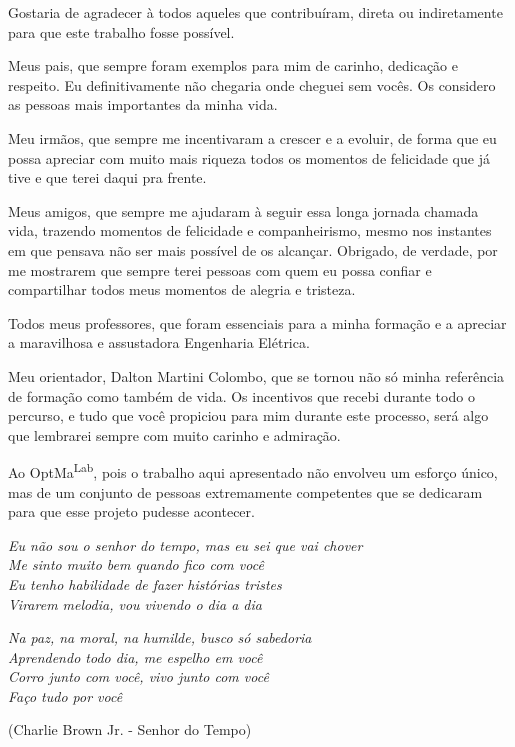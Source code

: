 \begin{agradecimentos}
Gostaria de agradecer à todos aqueles que contribuíram, direta ou indiretamente para que este trabalho fosse possível.

Meus pais, que sempre foram exemplos para mim de carinho, dedicação e respeito. Eu definitivamente não chegaria onde cheguei sem vocês. Os considero as pessoas mais importantes da minha vida.

Meu irmãos, que sempre me incentivaram a crescer e a evoluir, de forma que eu possa apreciar com muito mais riqueza todos os momentos de felicidade que já tive e que terei daqui pra frente.

Meus amigos, que sempre me ajudaram à seguir essa longa jornada chamada vida, trazendo momentos de felicidade e companheirismo, mesmo nos instantes em que pensava não ser mais possível de os alcançar. Obrigado, de verdade, por me mostrarem que sempre terei pessoas com quem eu possa confiar e compartilhar todos meus momentos de alegria e tristeza.

Todos meus professores, que foram essenciais para a minha formação e a apreciar a maravilhosa e assustadora Engenharia Elétrica.

Meu orientador, Dalton Martini Colombo, que se tornou não só minha referência de formação como também de vida. Os incentivos que recebi durante todo o percurso, e tudo que você propiciou para mim durante este processo, será algo que lembrarei sempre com muito carinho e admiração.

Ao OptMa\textsuperscript{Lab}, pois o trabalho aqui apresentado não envolveu um esforço único, mas de um conjunto de pessoas extremamente competentes que se dedicaram para que esse projeto pudesse acontecer.

\end{agradecimentos}

\begin{epigrafe}
    \vspace*{\fill}
	\begin{flushright}
		\textit{Eu não sou o senhor do tempo, mas eu sei que vai chover\\
        Me sinto muito bem quando fico com você\\
        Eu tenho habilidade de fazer histórias tristes\\
        Virarem melodia, vou vivendo o dia a dia}
        
        \textit{
        Na paz, na moral, na humilde, busco só sabedoria\\
        Aprendendo todo dia, me espelho em você\\
        Corro junto com você, vivo junto com você\\
        Faço tudo por você}
        
        (Charlie Brown Jr. - Senhor do Tempo)
	\end{flushright}
\end{epigrafe}

